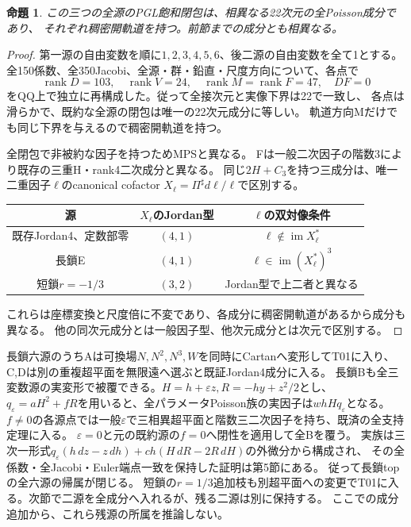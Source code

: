 \documentclass[a4paper,11pt]{ltjsarticle}
\newtheorem{proposition}{命題}[section]
\theoremstyle{definition}
\begin{document}
\begin{proposition}\label{prop:nil31-three22}
この三つの全源のPGL飽和閉包は、相異なる22次元の全Poisson成分であり、
それぞれ稠密開軌道を持つ。前節までの成分とも相異なる。
\end{proposition}
\begin{proof}
第一源の自由変数を順に$1,2,3,4,5,6$、後二源の自由変数を全て1とする。
全150係数、全350Jacobi、全源・群・鉛直・尺度方向について、各点で
\[
 \operatorname{rank}D=103,\quad \operatorname{rank}V=24,\quad
 \operatorname{rank}M=\operatorname{rank}F=47,\quad DF=0
\]
をQQ上で独立に再構成した。従って全接次元と実像下界は22で一致し、
各点は滑らかで、既約な全源の閉包は唯一の22次元成分に等しい。
軌道方向Mだけでも同じ下界を与えるので稠密開軌道を持つ。

全閉包で非被約な因子を持つためMPSと異なる。
Fは一般二次因子の階数3により既存の三重H・rank4二次成分と異なる。
同じ$2H+C_3$を持つ三成分は、唯一二重因子$\ell$のcanonical cofactor
$X_\ell=\Pi^\sharp d\ell/\ell$で区別する。
\begin{center}\small
\begin{tabular}{c|c|c}
源&$X_\ell$のJordan型&$\ell$の双対像条件\\\hline
既存Jordan4、定数部零&$(4,1)$&$\ell\notin\operatorname{im}X_\ell^*$\\
長鎖E&$(4,1)$&$\ell\in\operatorname{im}(X_\ell^*)^3$\\
短鎖$r=-1/3$&$(3,2)$&Jordan型で上二者と異なる
\end{tabular}
\end{center}
これらは座標変換と尺度倍に不変であり、各成分に稠密開軌道があるから成分も異なる。
他の同次元成分とは一般因子型、他次元成分とは次元で区別する。
\end{proof}

長鎖六源のうちAは可換場$N,N^2,N^3,W$を同時にCartanへ変形してT01に入り、
C,Dは別の重複超平面を無限遠へ選ぶと既証Jordan4成分に入る。
長鎖Bも全三変数源の実変形で被覆できる。$H=h+\varepsilon z,R=-hy+z^2/2$とし、
$q_\varepsilon=aH^2+fR$を用いると、全パラメータPoisson族の実因子は$whHq_\varepsilon$となる。
$f\ne0$の各源点では一般$\varepsilon$で三相異超平面と階数三二次因子を持ち、既済の全支持定理に入る。
$\varepsilon=0$と元の既約源の$f=0$へ閉性を適用して全Bを覆う。
実族は三次一形式$q_\varepsilon(h\,dz-z\,dh)+ch(H\,dR-2R\,dH)$の外微分から構成され、
その全係数・全Jacobi・Euler端点一致を保持した証明は第5節にある。
従って長鎖topの全六源の帰属が閉じる。
短鎖の$r=1/3$追加枝も別超平面への変更でT01に入る。次節で二源を全成分へ入れるが、残る二源は別に保持する。
ここでの成分追加から、これら残源の所属を推論しない。
\end{document}
